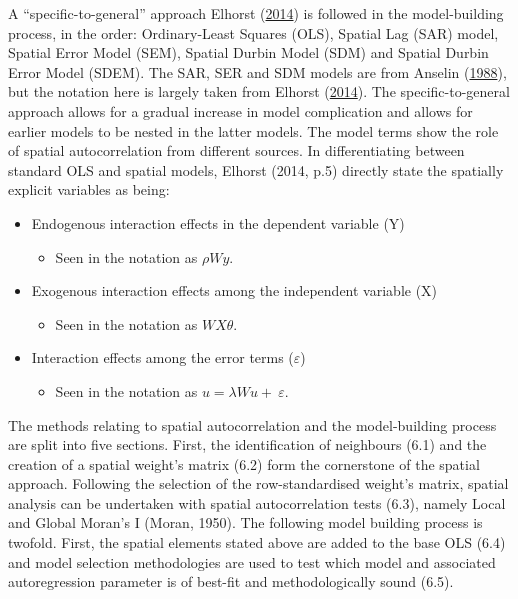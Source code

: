 \documentclass[12pt,twoside]{reedthesis}
\providecommand{\tightlist}{%
  \setlength{\itemsep}{0pt}\setlength{\parskip}{0pt}}
\begin{document}
A ``specific-to-general'' approach Elhorst (\protect\hyperlink{ref-elhorst2014}{2014}) is followed in the model-building process, in the order: Ordinary-Least Squares (OLS), Spatial Lag (SAR) model, Spatial Error Model (SEM), Spatial Durbin Model (SDM) and Spatial Durbin Error Model (SDEM). The SAR, SER and SDM models are from Anselin (\protect\hyperlink{ref-anselin1988}{1988}), but the notation here is largely taken from Elhorst (\protect\hyperlink{ref-elhorst2014}{2014}). The specific-to-general approach allows for a gradual increase in model complication and allows for earlier models to be nested in the latter models. The model terms show the role of spatial autocorrelation from different sources. In differentiating between standard OLS and spatial models, Elhorst (2014, p.5) directly state the spatially explicit variables as being:
\begin{itemize}
\tightlist
\item
  Endogenous interaction effects in the dependent variable (Y)
  \begin{itemize}
  \tightlist
  \item
    Seen in the notation as \(\rho Wy\).
  \end{itemize}
\item
  Exogenous interaction effects among the independent variable (X)
  \begin{itemize}
  \tightlist
  \item
    Seen in the notation as \(WX\theta\).
  \end{itemize}
\item
  Interaction effects among the error terms (\(\varepsilon\))
  \begin{itemize}
  \tightlist
  \item
    Seen in the notation as \(u=\lambda Wu+\ \varepsilon\).
  \end{itemize}
\end{itemize}
The methods relating to spatial autocorrelation and the model-building process are split into five sections. First, the identification of neighbours (6.1) and the creation of a spatial weight's matrix (6.2) form the cornerstone of the spatial approach. Following the selection of the row-standardised weight's matrix, spatial analysis can be undertaken with spatial autocorrelation tests (6.3), namely Local and Global Moran's I (Moran, 1950). The following model building process is twofold. First, the spatial elements stated above are added to the base OLS (6.4) and model selection methodologies are used to test which model and associated autoregression parameter is of best-fit and methodologically sound (6.5).
\end{document}
